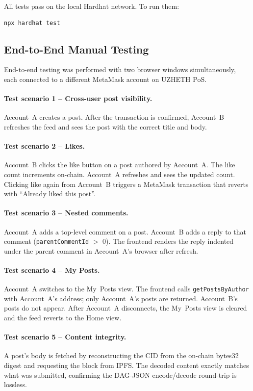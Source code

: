 \documentclass[11pt]{article}
\begin{document}
All tests pass on the local Hardhat network. To run them:

\begin{lstlisting}[style=command]
npx hardhat test
\end{lstlisting}

\subsection{End-to-End Manual Testing}

End-to-end testing was performed with two browser windows simultaneously, each connected to a different MetaMask account on UZHETH PoS.

\paragraph{Test scenario 1 – Cross-user post visibility.}
Account~A creates a post. After the transaction is confirmed, Account~B refreshes the feed and sees the post with the correct title and body.

\paragraph{Test scenario 2 – Likes.}
Account~B clicks the like button on a post authored by Account~A. The like count increments on-chain. Account~A refreshes and sees the updated count. Clicking like again from Account~B triggers a MetaMask transaction that reverts with ``Already liked this post''.

\paragraph{Test scenario 3 – Nested comments.}
Account~A adds a top-level comment on a post. Account~B adds a reply to that comment (\texttt{parentCommentId} $>$ 0). The frontend renders the reply indented under the parent comment in Account~A's browser after refresh.

\paragraph{Test scenario 4 -- My Posts.}
Account~A switches to the My~Posts view. The frontend calls \texttt{getPostsByAuthor} with Account~A's address; only Account~A's posts are returned. Account~B's posts do not appear. After Account~A disconnects, the My~Posts view is cleared and the feed reverts to the Home view.

\paragraph{Test scenario 5 -- Content integrity.}
A post's body is fetched by reconstructing the CID from the on-chain bytes32 digest and requesting the block from IPFS. The decoded content exactly matches what was submitted, confirming the DAG-JSON encode/decode round-trip is lossless.
\end{document}
